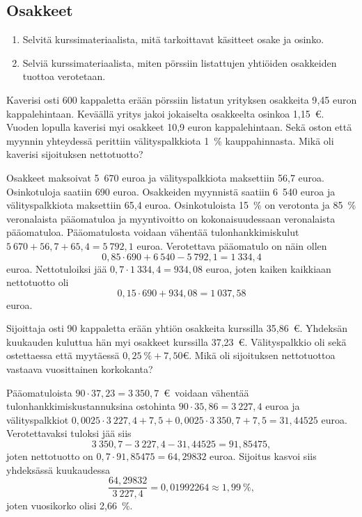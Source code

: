 \documentclass{article}\usepackage[]{graphicx}\usepackage[]{color}
\begin{document}
\subsection*{Osakkeet}

\begin{enumerate}
  \item Selvitä kurssimateriaalista, mitä tarkoittavat käsitteet osake ja osinko.
  \item Selviä kurssimateriaalista, miten pörssiin listattujen yhtiöiden osakkeiden tuottoa verotetaan.
\end{enumerate}
 
\begin{question} 
    Kaverisi osti 600 kappaletta erään pörssiin listatun yrityksen osakkeita 9{,}45 euron kappalehintaan. Keväällä yritys jakoi jokaiselta osakkeelta osinkoa 1{,}15~\euro. Vuoden lopulla kaverisi myi osakkeet 10{,}9 euron kappalehintaan. Sekä oston että myynnin yhteydessä perittiin välityspalkkiota 1~\% kauppahinnasta. Mikä oli kaverisi sijoituksen nettotuotto?
\end{question}
\begin{solution}
    Osakkeet maksoivat 5~670 euroa ja välityspalkkiota maksettiin 56{,}7 euroa. Osinkotuloja saatiin 690 euroa. Osakkeiden myynnistä saatiin 6~540 euroa ja välityspalkkiota maksettiin 65{,}4 euroa. 
    Osinkotuloista 15~\% on verotonta ja 85~\% veronalaista pääomatuloa ja myyntivoitto on kokonaisuudessaan veronalaista pääomatuloa. Pääomatulosta voidaan vähentää tulonhankkimiskulut \(5~670 + 56{,}7 +65{,}4 = 5~792{,}1\) euroa. Verotettava pääomatulo on näin ollen
    \[
        0,85\cdot690 + 6~540 - 5~792{,}1 = 1~334{,}4
    \]
    euroa. Nettotuloiksi jää \(0,7\cdot1~334{,}4 = 934{,}08\) euroa, joten kaiken kaikkiaan nettotuotto oli
    \[
        0,15\cdot690 + 934{,}08 = 1~037{,}58
    \]
    euroa. 
\end{solution}

\begin{question}
    Sijoittaja osti 90 kappaletta erään yhtiön osakkeita kurssilla 35{,}86~\euro. Yhdeksän kuukauden kuluttua hän myi osakkeet kurssilla 37{,}23~\euro. Välityspalkkio oli sekä ostettaessa että myytäessä $0{,}25\ \%  + 7{,}50 \euro$. Mikä oli sijoituksen nettotuottoa vastaava vuosittainen korkokanta?
\end{question}
\begin{solution}
    Pääomatuloista \(90\cdot37{,}23 = 3~350{,}7\)~\euro\ voidaan vähentää tulonhankkimiskustannuksina ostohinta \(90\cdot35{,}86 = 3~227{,}4\) euroa ja välityspalkkiot \(0,0025\cdot3~227{,}4 + 7,5 + 0,0025\cdot3~350{,}7 + 7,5 = 31{,}44525\) euroa. Verotettavaksi tuloksi jää siis 
    \[
        3~350{,}7 - 3~227{,}4 - 31{,}44525 = 91{,}85475,
    \]
    joten nettotuotto on \(0,7\cdot91{,}85475 = 64{,}29832\) euroa. Sijoitus kasvoi siis yhdeksässä kuukaudessa
    \[
        \frac{64{,}29832}{3~227{,}4} = 0{,}01992264 \approx 1{,}99~\%,
    \]
    joten vuosikorko olisi 2{,}66~\%.
\end{solution}
\end{document}
